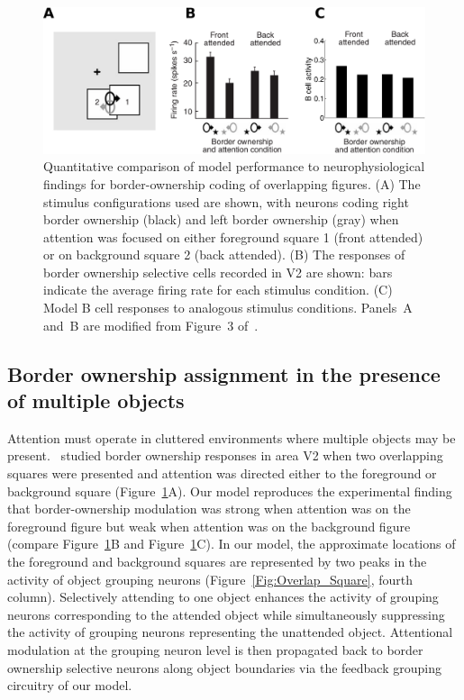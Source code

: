 \begin{figure}[t]
\centering
\includegraphics[width=\textwidth]{Contour/figs/Fig7.eps}
\makeatletter
\let\@currsize\normalsize
\caption[Comparison of model results to the Qiu et al. experiments]{Quantitative comparison of model performance to neurophysiological findings \citep{Qiu_etal07} for border-ownership coding of  overlapping figures. (A) The stimulus configurations used are shown, with neurons coding right border ownership (black) and left border ownership (gray) when attention was focused on either foreground square 1 (front attended) or on background square 2 (back attended). (B) The responses of border ownership selective cells recorded in V2 are shown:  bars indicate the average firing rate for each stimulus condition. (C) Model B cell responses to analogous stimulus conditions.
Panels~A and~B are modified from Figure~3 of~\cite{Qiu_etal07}.}
\label{Fig:Overlap_Square_exp_model}
\end{figure}

\subsection{Border ownership assignment in the presence of multiple objects}
\label{sec:BOS_overlap}

Attention must operate in cluttered environments where multiple
objects may be present.~\cite{Qiu_etal07} studied border ownership
responses in area V2 when two overlapping squares were presented and
attention was directed either to the foreground or background square
(Figure~\ref{Fig:Overlap_Square_exp_model}A). Our model reproduces the
experimental finding that border-ownership modulation was strong when
attention was on the foreground figure but weak when attention was on
the background figure (compare
Figure~\ref{Fig:Overlap_Square_exp_model}B and
Figure~\ref{Fig:Overlap_Square_exp_model}C).
In our model, the approximate locations of the foreground and
background squares are represented by two peaks in the activity of
object grouping neurons (Figure~\ref{Fig:Overlap_Square}, fourth
column). Selectively attending to one object enhances the activity of
grouping neurons corresponding to the attended object while
simultaneously suppressing the activity of grouping neurons
representing the unattended object. Attentional modulation at the
grouping neuron level is then propagated back to border ownership
selective neurons along object boundaries via the feedback grouping
circuitry of our model.

